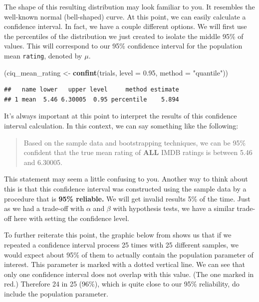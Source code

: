 \documentclass[]{tufte-book}
\newenvironment{Shaded}{\begin{snugshade}}{\end{snugshade}}
\newcommand{\KeywordTok}[1]{\textcolor[rgb]{0.13,0.29,0.53}{\textbf{{#1}}}}
\newcommand{\DataTypeTok}[1]{\textcolor[rgb]{0.13,0.29,0.53}{{#1}}}
\newcommand{\FloatTok}[1]{\textcolor[rgb]{0.00,0.00,0.81}{{#1}}}
\newcommand{\StringTok}[1]{\textcolor[rgb]{0.31,0.60,0.02}{{#1}}}
\newcommand{\NormalTok}[1]{{#1}}
\begin{document}
The shape of this resulting distribution may look familiar to you. It
resembles the well-known normal (bell-shaped) curve. At this point, we
can easily calculate a confidence interval. In fact, we have a couple
different options. We will first use the percentiles of the distribution
we just created to isolate the middle 95\% of values. This will
correspond to our 95\% confidence interval for the population mean
\texttt{rating}, denoted by \(\mu\).

\begin{Shaded}
\begin{Highlighting}[]
\NormalTok{(ciq_mean_rating <-}\StringTok{ }\KeywordTok{confint}\NormalTok{(trials, }\DataTypeTok{level =} \FloatTok{0.95}\NormalTok{, }\DataTypeTok{method =} \StringTok{"quantile"}\NormalTok{))}
\end{Highlighting}
\end{Shaded}

\begin{verbatim}
##   name lower   upper level     method estimate
## 1 mean  5.46 6.30005  0.95 percentile    5.894
\end{verbatim}

It's always important at this point to interpret the results of this
confidence interval calculation. In this context, we can say something
like the following:

\begin{quote}
Based on the sample data and bootstrapping techniques, we can be 95\%
confident that the true mean rating of \textbf{ALL} IMDB ratings is
between 5.46 and 6.30005.
\end{quote}

This statement may seem a little confusing to you. Another way to think
about this is that this confidence interval was constructed using the
sample data by a procedure that is \textbf{95\% reliable.} We will get
invalid results 5\% of the time. Just as we had a trade-off with
\(\alpha\) and \(\beta\) with hypothesis tests, we have a similar
trade-off here with setting the confidence level.

To further reiterate this point, the graphic below from \citet{isrs2014}
shows us that if we repeated a confidence interval process 25 times with
25 different samples, we would expect about 95\% of them to actually
contain the population parameter of interest. This parameter is marked
with a dotted vertical line. We can see that only one confidence
interval does not overlap with this value. (The one marked in red.)
Therefore 24 in 25 (96\%), which is quite close to our 95\% reliability,
do include the population parameter.
\end{document}
